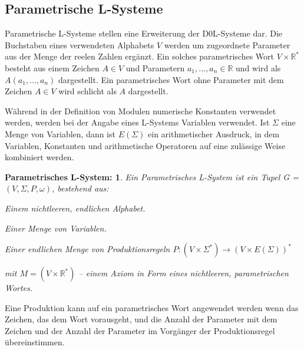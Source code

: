 \subsection{Parametrische L-Systeme}

Parametrische L-Systeme stellen eine Erweiterung der D0L-Systeme dar. Die Buchstaben eines verwendeten Alphabets $V$ werden um zugeordnete Parameter aus der Menge der reelen Zahlen ergänzt. Ein solches parametrisches Wort $V \times \mathbb{R}^*$ besteht aus einem Zeichen $A \in V$ und Parametern $a_1,...,a_n \in \mathbb{R}$ und wird als $A(a_1,...,a_n)$ dargestellt. Ein parametrisches Wort ohne Parameter mit dem Zeichen $A \in V$  wird schlicht als $A$ dargestellt. \cite[S.41]{ABOP:04}

Während in der Definition von Modulen numerische Konstanten verwendet werden, werden bei der Angabe eines L-Systems Variablen verwendet. Ist $\Sigma$ eine Menge von Variablen, dann ist $E(\Sigma)$ ein arithmetischer Ausdruck, in dem Variablen, Konstanten und arithmetische Operatoren auf eine zulässige Weise kombiniert werden. \cite[S.41]{ABOP:04}

\newtheorem{defParametrischeLSysteme}{Parametrisches L-System:}[section]
\begin{defParametrischeLSysteme}
	Ein Parametrisches L-System ist ein Tupel G = $(V, \Sigma, P, \omega)$, bestehend aus:
	\begin{description}[labelindent]
		\item[\boldmath$V$] Einem nichtleeren, endlichen Alphabet.\\
		
		\item[\boldmath$\Sigma$] Einer Menge von Variablen.\\
		
		\item[\boldmath$P$] Einer endlichen Menge von Produktionsregeln $P : (V\times \Sigma^*) \rightarrow (V\times E(\Sigma))^*$\\
		
		\item[\boldmath$\omega \in M^+$] mit $M =(V \times \mathbb{R}^*)$ -- einem Axiom in Form eines nichtleeren, parametrischen Wortes.
	\end{description}
\cite[S.41]{ABOP:04}
\end{defParametrischeLSysteme}

Eine Produktion kann auf ein parametrisches Wort angewendet werden wenn das Zeichen, das dem Wort vorausgeht, und die Anzahl der Parameter mit dem Zeichen und der Anzahl der Parameter im Vorgänger der Produktionsregel übereinstimmen. \cite[S.42]{ABOP:04}

